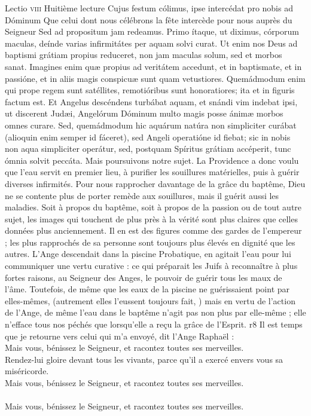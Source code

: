 \documentclass[twoside]{article}
\begin{document}
\begin{paracol}[1]{2}
\lectioresponsorium
	{Lectio \textsc{viii}}
	{Huitième lecture}
	{Cujus festum cólimus, ipse intercédat pro nobis ad Dóminum}
	{Que celui dont nous célébrons la fête intercède pour nous auprès du Seigneur}
	{
		Sed ad propositum jam redeamus. Primo ítaque, ut diximus, córporum maculas, deínde varias infirmitátes per aquam solvi curat. Ut enim nos Deus ad baptismi grátiam propius reduceret, non jam maculas solum, sed et morbos sanat. Imagines enim quæ propius ad veritátem accedunt, et in baptismate, et in passióne, et in aliis magis conspicuæ sunt quam vetustiores. Quemádmodum enim qui prope regem sunt satéllites, remotióribus sunt honoratiores; ita et in figuris factum est. Et Angelus descéndens turbábat aquam, et snándi vim indebat ipsi, ut discerent Judæi, Angelórum Dóminum multo magis posse ánimæ morbos omnes curare. Sed, quemádmodum hic aquárum natúra non simpliciter curábat (alioquin enim semper id fáceret), sed Angeli operatióne id fiebat; sic in nobis non aqua simpliciter operátur, sed, postquam Spíritus grátiam accéperit, tunc ómnia solvit peccáta.
	}
	{
		Mais poursuivons notre sujet. La Providence a donc voulu que l’eau servit en premier lieu, à purifier les souillures matérielles, puis à guérir diverses infirmités. Pour nous rapprocher davantage de la grâce du baptême, Dieu ne se contente plus de porter remède aux souillures, mais il guérit aussi les maladies. Soit à propos du baptême, soit à propos de la passion ou de tout autre sujet, les images qui touchent de plus près à la vérité sont plus claires que celles données plus anciennement. Il en est des figures comme des gardes de l’empereur ; les plus rapprochés de sa personne sont toujours plus élevés en dignité que les autres. L’Ange descendait dans la piscine Probatique, en agitait l’eau pour lui communiquer une vertu curative : ce qui préparait les Juifs à reconnaître à plus fortes raisons, au Seigneur des Anges, le pouvoir de guérir tous les maux de l’âme. Toutefois, de même que les eaux de la piscine ne guérissaient point par elles-mêmes, (autrement elles l’eussent toujours fait, ) mais en vertu de l’action de l’Ange, de même l’eau dans le baptême n’agit pas non plus par elle-même ; elle n’efface tous nos péchés que lorsqu’elle a reçu la grâce de l’Esprit.
	}
	{r8}
	{\rr Il est temps que je retourne vers celui qui m’a envoyé, dit l’Ange Raphaël :\\
	\GreSpecial{*} Mais vous, bénissez le Seigneur, et racontez toutes ses merveilles.\\
	\vv Rendez-lui gloire devant tous les vivants, parce qu’il a exercé envers vous sa miséricorde.\\
	\GreSpecial{*} Mais vous, bénissez le Seigneur, et racontez toutes ses merveilles.\\
	\versetGloireAuPere{}\\
	\GreSpecial{*} Mais vous, bénissez le Seigneur, et racontez toutes ses merveilles.}
	

\end{paracol}
\end{document}
